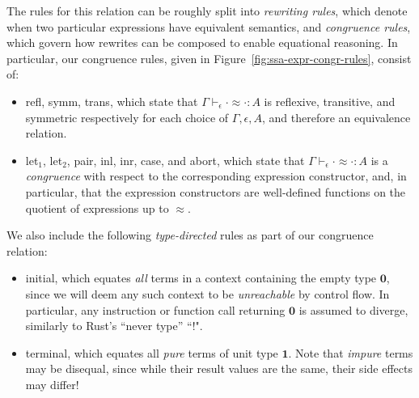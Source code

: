 \documentclass[acmsmall,screen,review]{acmart}
\newcommand{\mb}[1]{\ensuremath{\mathbf{#1}}}
\newcommand{\teqv}{\approx}
\newcommand{\tmeq}[5]{#1 \vdash_{#2} #3 \teqv #4 : {#5}}
\newcommand{\brle}[1]{{\textsf{#1}}}
\begin{document}
The rules for this relation can be roughly split into \emph{rewriting rules}, which denote when two
particular expressions have equivalent semantics, and \emph{congruence rules}, which govern how
rewrites can be composed to enable equational reasoning. In particular, our congruence rules, given
in Figure~\ref{fig:ssa-expr-congr-rules}, consist of:
\begin{itemize}
  \item \brle{refl}, \brle{symm}, \brle{trans}, which state that
  $\tmeq{\Gamma}{\epsilon}{\cdot}{\cdot}{A}$ is reflexive, transitive, and symmetric respectively
  for each choice of $\Gamma, \epsilon, A$, and therefore an equivalence relation.
  \item \brle{let$_1$}, \brle{let$_2$}, \brle{pair}, \brle{inl}, \brle{inr}, \brle{case}, and
  \brle{abort}, which state that $\tmeq{\Gamma}{\epsilon}{\cdot}{\cdot}{A}$ is a \emph{congruence}
  with respect to the corresponding expression constructor, and, in particular, that the expression
  constructors are well-defined functions on the quotient of expressions up to $\teqv$.
\end{itemize} 
We also include the following \emph{type-directed} rules as part of our congruence relation:
\begin{itemize}
  \item \brle{initial}, which equates \emph{all} terms in a context containing the empty type
  $\mb{0}$, since we will deem any such context to be \emph{unreachable} by control flow. In
  particular, any instruction or function call returning $\mb{0}$ is assumed to diverge, similarly
  to Rust's ``never type'' ``$!$".
  \item \brle{terminal}, which equates all \emph{pure} terms of unit type $\mb{1}$. Note that
  \emph{impure} terms may be disequal, since while their result values are the same, their side
  effects may differ!
\end{itemize}
\end{document}
